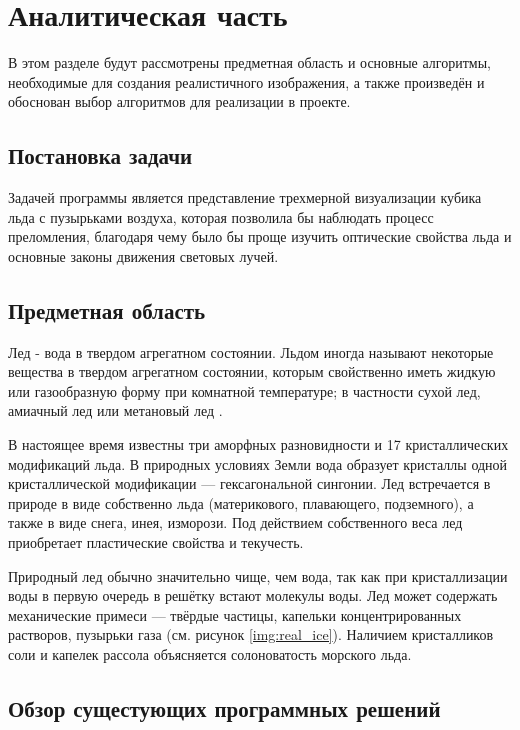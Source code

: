 \chapter{Аналитическая часть}

В этом разделе будут рассмотрены предметная область и основные алгоритмы,
необходимые для создания реалистичного изображения, а также произведён
и обоснован выбор алгоритмов для реализации в проекте.

\section{Постановка задачи}

Задачей программы является представление трехмерной визуализации кубика льда с пузырьками воздуха, которая позволила бы наблюдать процесс преломления, благодаря чему было бы проще изучить оптические свойства льда и основные законы движения световых лучей.

\section{Предметная область}

Лед - вода в твердом агрегатном состоянии. Льдом иногда называют некоторые вещества в твердом агрегатном состоянии, которым свойственно иметь жидкую или газообразную форму при комнатной температуре; в частности сухой лед, амиачный лед или метановый лед \cite{icenature}.

В настоящее время известны три аморфных разновидности и 17 кристаллических модификаций льда.  В природных условиях Земли вода образует кристаллы одной кристаллической модификации — гексагональной сингонии. Лед встречается в природе в виде собственно льда (материкового, плавающего, подземного), а также в виде снега, инея, изморози. Под действием собственного веса лед приобретает пластические свойства и текучесть.

Природный лед обычно значительно чище, чем вода, так как при кристаллизации воды в первую очередь в решётку встают молекулы воды. Лед может содержать механические примеси — твёрдые частицы, капельки концентрированных растворов, пузырьки газа (см. рисунок \ref{img:real_ice}). Наличием кристалликов соли и капелек рассола объясняется солоноватость морского льда.


\section{Обзор сущестующих программных решений}

